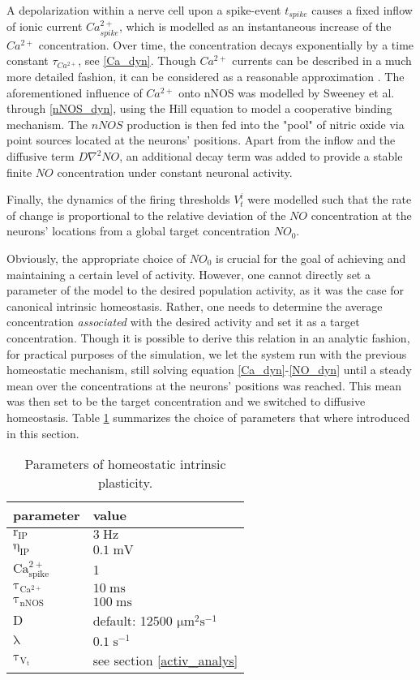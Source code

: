 \documentclass[10pt,a4paper]{article}
\begin{document}
A depolarization within a nerve cell upon a spike-event $t_{spike}$ causes a fixed inflow of ionic current $Ca^{2+}_{spike}$, which is modelled as an instantaneous increase of the $Ca^{2+}$ concentration. Over time, the concentration decays exponentially by a time constant $\tau_{Ca^{2+}}$, see \eqref{Ca_dyn}. Though $Ca^{2+}$ currents can be described in a much more detailed fashion, it can be considered as a reasonable approximation \cite[p.~198-203]{Theor_Neur_Dayan}. The aforementioned influence of $Ca^{2+}$ onto nNOS was modelled by Sweeney et al. through \eqref{nNOS_dyn}, using the Hill equation \cite{Hill_Equ} to model a cooperative binding mechanism. The $nNOS$ production is then fed into the "pool" of nitric oxide via point sources located at the neurons' positions. Apart from the inflow and the diffusive term $D \nabla^2 NO$, an additional decay term was added to provide a stable finite $NO$ concentration under constant neuronal activity.

Finally, the dynamics of the firing thresholds $V_t^i$ were modelled such that the rate of change is proportional to the relative deviation of the $NO$ concentration at the neurons' locations from a global target concentration $NO_0$. 

Obviously, the appropriate choice of $NO_0$ is crucial for the goal of achieving and maintaining a certain level of activity. However, one cannot directly set a parameter of the model to the desired population activity, as it was the case for canonical intrinsic homeostasis. Rather, one needs to determine the average concentration \textit{associated} with the desired activity and set it as a target concentration. Though it is possible to derive this relation in an analytic fashion, for practical purposes of the simulation, we let the system run with the previous homeostatic mechanism, still solving equation \eqref{Ca_dyn}-\eqref{NO_dyn} until a steady mean over the concentrations at the neurons' positions was reached. This mean was then set to be the target concentration and we switched to diffusive homeostasis. Table \ref{Params_IP} summarizes the choice of parameters that where introduced in this section.
\begin{table}
\begin{tabular}{|l|l|}
\hline
\textbf{parameter} & \textbf{value} \\
\hline
$\mathrm{r_{IP}}$ & $\mathrm{3\;Hz}$ \\
\hline
$\mathrm{\eta_{IP}}$ & $\mathrm{0.1\;mV}$ \\
\hline
$\mathrm{Ca^{2+}_{spike}}$ & 1 \\ \hline
$\mathrm{\tau_{Ca^{2+}}}$ &  $\mathrm{10\;ms}$ \\
\hline
$\mathrm{\tau_{nNOS}}$ & $\mathrm{100\;ms}$ \\
\hline
$\mathrm{D}$ & default: 12500 $\mathrm{\mu m^2 s^{-1}}$ \\
\hline 
$\mathrm{\lambda}$ & $\mathrm{0.1\;s^{-1}}$ \\
\hline
$\mathrm{\tau_{V_t}}$ & see section \ref{activ_analys} \\
\hline
\end{tabular}
\caption{Parameters of homeostatic intrinsic plasticity.}
\label{Params_IP}
\end{table}
\end{document}
